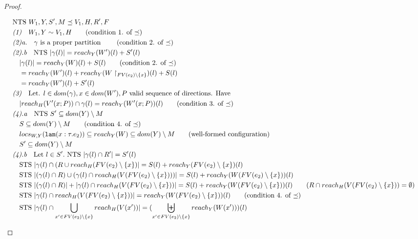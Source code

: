 \documentclass{easychair}
\newcommand{\irl}[1]{\mathtt{#1}}
\theoremstyle{definition}
\begin{document}
\begin{proof}
\begin{description}
\begin{align*}
		&\text{NTS } W_1,Y,S',M \preceq V_1,H,R',F\\
		&\emph{(1)}\quad W_1,Y \sim V_1,H \tag{condition 1. of $\preceq$}\\
		&\emph{(2)a.}\quad \gamma \text{ is a proper partition } \tag{condition 2. of $\preceq$}\\
		&\emph{(2).b}\quad \text{NTS } |\gamma(l)| = reach_Y(W')(l) + S'(l)\\
		&\quad |\gamma(l)| = reach_Y(W)(l) + S(l) \tag{condition 2. of $\preceq$}\\
		&\quad = reach_Y(W')(l) + reach_Y(W\restriction_{FV(e_2)\setminus \{x\}})(l) + S(l)\\
		&\quad = reach_Y(W')(l) + S'(l)\\
		&\emph{(3)}\quad \text{Let. } l \in dom(\gamma), x \in dom(W'), P \text{ valid sequence of 
		directions. Have }\\
		&\quad |reach_H(V'(x;P)) \cap \gamma(l) = reach_Y(W'(x;P))(l) 
			\tag{condition 3. of $\preceq$}\\
		&\emph{(4).a}\quad \text{NTS } S' \subseteq dom(Y)\setminus M\\
		&\quad S \subseteq dom(Y)\setminus M \tag{condition 4. of $\preceq$}\\
		&\quad locs_{W,Y}(\irl{lam}(x : \tau.e_2)) \subseteq reach_Y(W) \subseteq dom(Y) \setminus M
			\tag{well-formed configuration}\\
		&\quad S' \subseteq dom(Y)\setminus M\\ 
		&\emph{(4).b}\quad \text{Let } l \in S'. \text{ NTS } |\gamma(l) \cap R'| = S'(l)\\
		&\quad \text{STS }  |\gamma(l) \cap (R \cup reach_H(FV(e_2) \setminus \{x\})| = S(l) + 
			reach_Y(FV(e_2) \setminus \{x\})(l)\\
		&\quad \text{STS } |(\gamma(l) \cap R) \cup (\gamma(l) \cap 
			reach_H(V(FV(e_2) \setminus \{x\})))| 
			= S(l) + reach_Y(W(FV(e_2) \setminus \{x\}))(l)\\
		&\quad \text{STS } |(\gamma(l) \cap R)| + |\gamma(l) \cap reach_H(V(FV(e_2) \setminus \{x\}))| 
			= S(l) + reach_Y(W(FV(e_2) \setminus \{x\}))(l) 
			\tag{$R \cap reach_H(V(FV(e_2) \setminus \{x\})) = \emptyset$}\\
		&\quad \text{STS } |\gamma(l) \cap reach_H(V(FV(e_2) \setminus \{x\}))| 
			= reach_Y(W(FV(e_2) \setminus \{x\}))(l) \tag{condition 4. of $\preceq$}\\
		&\quad \text{STS } |\gamma(l) \cap \bigcup_{x' \in FV(e_2) \setminus \{x\}} reach_H(V(x'))|
			= (\biguplus_{x' \in FV(e_2) \setminus \{x\}} reach_Y(W(x')))(l)\\

\end{align*}
\end{description}
\end{proof}
\end{document}
